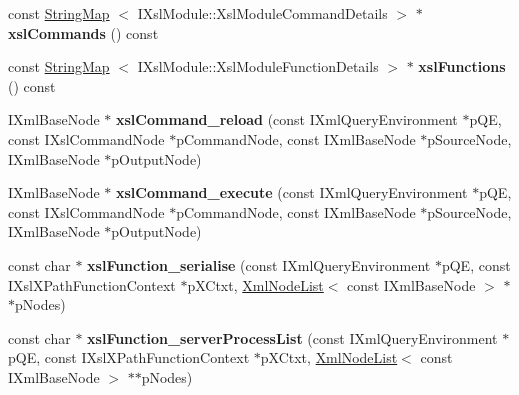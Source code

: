\begin{DoxyCompactItemize}
\item 
\hypertarget{classgeneral__server_1_1Server_aa133f6e5d70d76a39abdb2f77eb6b146}{const \hyperlink{classgeneral__server_1_1StringMap}{\-String\-Map}\*
$<$ \-I\-Xsl\-Module\-::\-Xsl\-Module\-Command\-Details $>$ $\ast$ {\bfseries xsl\-Commands} () const }\label{classgeneral__server_1_1Server_aa133f6e5d70d76a39abdb2f77eb6b146}

\item 
\hypertarget{classgeneral__server_1_1Server_a39454c71bcb99a2e3959b8d0abd9418b}{const \hyperlink{classgeneral__server_1_1StringMap}{\-String\-Map}\*
$<$ \-I\-Xsl\-Module\-::\-Xsl\-Module\-Function\-Details $>$ $\ast$ {\bfseries xsl\-Functions} () const }\label{classgeneral__server_1_1Server_a39454c71bcb99a2e3959b8d0abd9418b}

\item 
\hypertarget{group__XSLModule-Commands_ga4dab2f43bb9bc69947c44479568cfa03}{\-I\-Xml\-Base\-Node $\ast$ {\bfseries xsl\-Command\-\_\-reload} (const \-I\-Xml\-Query\-Environment $\ast$p\-Q\-E, const \-I\-Xsl\-Command\-Node $\ast$p\-Command\-Node, const \-I\-Xml\-Base\-Node $\ast$p\-Source\-Node, \-I\-Xml\-Base\-Node $\ast$p\-Output\-Node)}\label{group__XSLModule-Commands_ga4dab2f43bb9bc69947c44479568cfa03}

\item 
\hypertarget{group__XSLModule-Commands_ga13bc0c51c747cf88f1debafae5ff16c0}{\-I\-Xml\-Base\-Node $\ast$ {\bfseries xsl\-Command\-\_\-execute} (const \-I\-Xml\-Query\-Environment $\ast$p\-Q\-E, const \-I\-Xsl\-Command\-Node $\ast$p\-Command\-Node, const \-I\-Xml\-Base\-Node $\ast$p\-Source\-Node, \-I\-Xml\-Base\-Node $\ast$p\-Output\-Node)}\label{group__XSLModule-Commands_ga13bc0c51c747cf88f1debafae5ff16c0}

\item 
\hypertarget{group__XSLModule-Functions_gae01c3067eedeb6bebf7c5eee92563ccb}{const char $\ast$ {\bfseries xsl\-Function\-\_\-serialise} (const \-I\-Xml\-Query\-Environment $\ast$p\-Q\-E, const \-I\-Xsl\-X\-Path\-Function\-Context $\ast$p\-X\-Ctxt, \hyperlink{classgeneral__server_1_1XmlNodeList}{\-Xml\-Node\-List}$<$ const \-I\-Xml\-Base\-Node $>$ $\ast$$\ast$p\-Nodes)}\label{group__XSLModule-Functions_gae01c3067eedeb6bebf7c5eee92563ccb}

\item 
\hypertarget{group__XSLModule-Functions_ga86abca68abb2fc5c924f6c3b574bc89d}{const char $\ast$ {\bfseries xsl\-Function\-\_\-server\-Process\-List} (const \-I\-Xml\-Query\-Environment $\ast$p\-Q\-E, const \-I\-Xsl\-X\-Path\-Function\-Context $\ast$p\-X\-Ctxt, \hyperlink{classgeneral__server_1_1XmlNodeList}{\-Xml\-Node\-List}$<$ const \-I\-Xml\-Base\-Node $>$ $\ast$$\ast$p\-Nodes)}\label{group__XSLModule-Functions_ga86abca68abb2fc5c924f6c3b574bc89d}


\end{DoxyCompactItemize}
